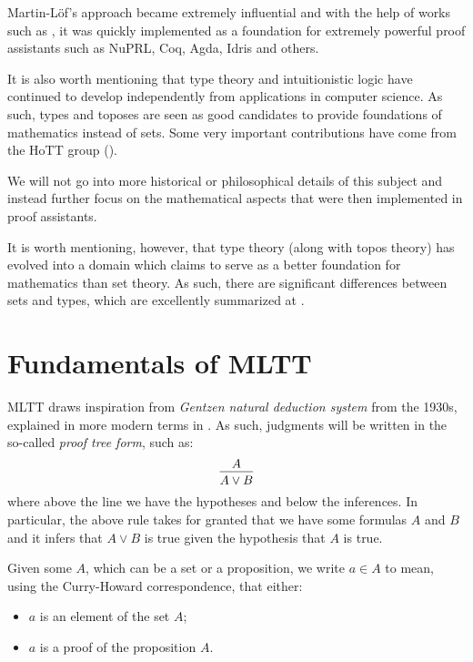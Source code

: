 Martin-L\"of's approach became extremely influential and with the help of
works such as \cite{pmltt}, it was quickly implemented as a foundation for
extremely powerful proof assistants such as NuPRL, Coq, Agda, Idris and others.

It is also worth mentioning that type theory and intuitionistic logic have
continued to develop independently from applications in computer science.
As such, types and toposes are seen as good candidates to provide
 foundations of mathematics instead of sets. Some very important
contributions have come from the HoTT group (\cite{hott}).

We will not go into more historical or philosophical details of this subject
and instead further focus on the mathematical aspects that were then
implemented in proof assistants.

It is worth mentioning, however, that type theory (along with topos theory)
has evolved into a domain which claims to serve as a better foundation for
mathematics than set theory. As such, there are significant differences
between sets and types, which are excellently summarized at
\cite[\S1.1]{hott}.


\section{Fundamentals of MLTT}
MLTT draws inspiration from \emph{Gentzen natural deduction system} from the 1930s,
explained in more modern terms in \cite{girard}. As such, judgments will be
written in the so-called \emph{proof tree form}, such as:
\[
  \begin{prooftree}
    \hypo{A}
    \infer1{A \lor B}
  \end{prooftree}
\]
where above the line we have the hypotheses and below the inferences.
In particular, the above rule takes for granted that we have some formulas
$ A $ and $ B $ and it infers that $ A \lor B $ is true given the hypothesis
that $ A $ is true.

Given some $ A $, which can be a set or a proposition, we write $ a \in A $
to mean, using the Curry-Howard correspondence, that either:
\begin{itemize}
\item $ a $ is an element of the set $ A $;
\item $ a $ is a proof of the proposition $ A $.
\end{itemize}

